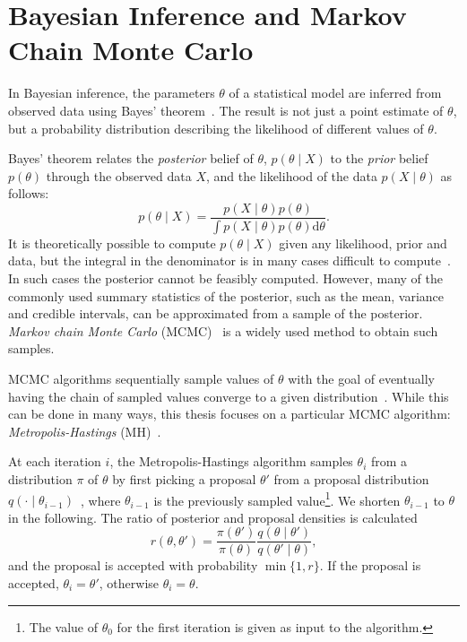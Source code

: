 \documentclass[english,twoside,openright]{HYgraduMLDS}
\newcommand{\dx}{\mathrm{d}}
\begin{document}
\section{Bayesian Inference and Markov Chain Monte Carlo}\label{MCMC_background}

In Bayesian inference, the parameters \(\theta\) of a statistical model are
inferred from 
observed data using Bayes' theorem~\cite{BDA}. The result is not just a point estimate 
of \(\theta\), but a probability distribution describing the likelihood
of different values of \(\theta\).

Bayes' theorem relates the \emph{posterior} belief of \(\theta\),
\(p(\theta \mid X)\) to the \emph{prior} belief \(p(\theta)\) through the 
observed data \(X\), and the likelihood of the data \(p(X\mid \theta)\) as follows:
\[
    p(\theta \mid X) = \frac{p(X \mid \theta)p(\theta)}
    {\int p(X\mid \theta)p(\theta)\dx\theta}.
\]
It is theoretically possible to compute \(p(\theta \mid X)\) given any 
likelihood, prior and data, but the integral in the denominator is in many 
cases difficult to compute~\cite{BDA}. In such cases the posterior cannot be feasibly 
computed. However, many of the commonly used summary statistics of the posterior, 
such as the mean, variance and credible intervals, can be approximated from 
a sample of the posterior. \emph{Markov chain Monte Carlo}
(MCMC)~\cite{MRR53} is a widely used method to obtain such samples.

MCMC algorithms sequentially sample values of \(\theta\)
with the goal of eventually having the chain of sampled values converge to 
a given distribution~\cite{BDA}. While this can be done in many ways, this thesis 
focuses on a particular MCMC algorithm:
\emph{Metropolis-Hastings} (MH)~\cite{MRR53, Has70}.

At each iteration \(i\), the Metropolis-Hastings algorithm samples \(\theta_i\)
from a distribution \(\pi\) of \(\theta\)
by first picking a proposal \(\theta'\) from a proposal 
distribution \(q(\cdot \mid \theta_{i-1})\)~\cite{MRR53}, where \(\theta_{i-1}\) is the
previously sampled value\footnote{
    The value of \(\theta_0\) for the first iteration is given as input to the 
    algorithm.
}. We shorten \(\theta_{i-1}\) to \(\theta\) in the following. 
The ratio of posterior and proposal densities is calculated
\[
    r(\theta, \theta') = \frac{\pi(\theta')}{\pi(\theta)}
    \frac{q(\theta\mid \theta')}{q(\theta'\mid \theta)},
\]
and the proposal is accepted with probability \(\min\{1, r\}\). 
If the proposal is accepted, 
\(\theta_i = \theta'\), otherwise \(\theta_i = \theta\).
\end{document}
